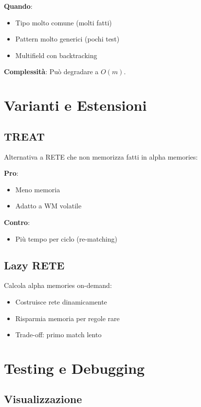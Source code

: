\textbf{Quando}:
\begin{itemize}
\item Tipo molto comune (molti fatti)
\item Pattern molto generici (pochi test)
\item Multifield con backtracking
\end{itemize}

\textbf{Complessità}: Può degradare a $O(m)$.

\section{Varianti e Estensioni}

\subsection{TREAT}

Alternativa a RETE che non memorizza fatti in alpha memories:

\textbf{Pro}:
\begin{itemize}
\item Meno memoria
\item Adatto a WM volatile
\end{itemize}

\textbf{Contro}:
\begin{itemize}
\item Più tempo per ciclo (re-matching)
\end{itemize}

\subsection{Lazy RETE}

Calcola alpha memories on-demand:

\begin{itemize}
\item Costruisce rete dinamicamente
\item Risparmia memoria per regole rare
\item Trade-off: primo match lento
\end{itemize}

\section{Testing e Debugging}

\subsection{Visualizzazione}

